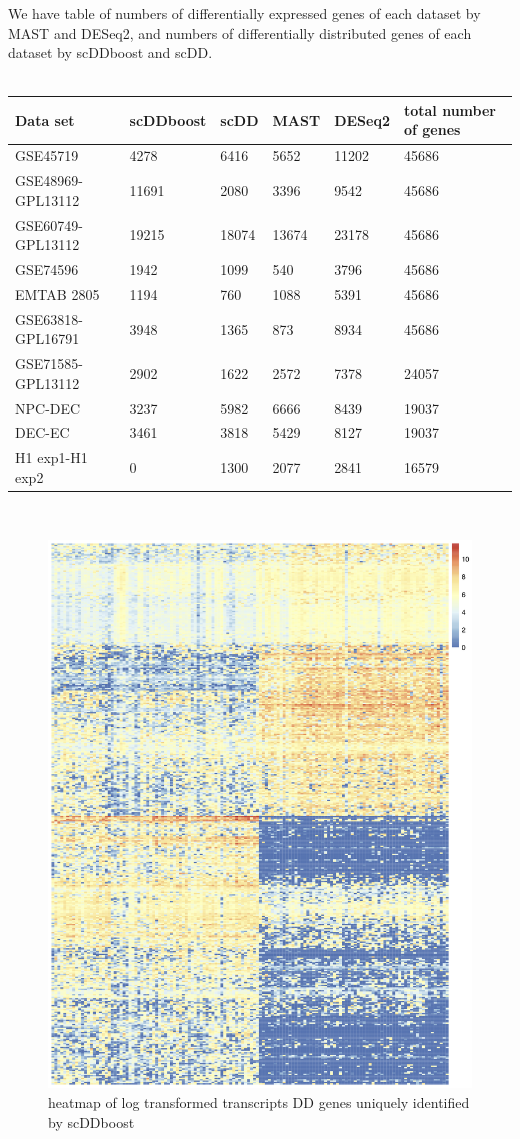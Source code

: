 \documentclass[11pt]{amsart}
\begin{document}
We have table of numbers of differentially expressed genes of each dataset by MAST and DESeq2, and numbers of differentially distributed genes of each dataset by scDDboost and scDD.\\
\\
\begin{tabular}{ |p{2cm}|p{2cm}|p{2cm}|p{2cm}|p{2cm}|p{2cm}|}
\hline
Data set & scDDboost & scDD & MAST & DESeq2 & total number of genes\\
\hline
\hline
GSE45719 & 4278 & 6416 &5652 & 11202 & 45686\\
\hline
GSE48969-GPL13112 & 11691 & 2080 & 3396 & 9542 & 45686\\
\hline
GSE60749-GPL13112 & 19215 &  18074 & 13674 & 23178 & 45686\\
\hline
GSE74596 & 1942 & 1099 & 540 & 3796 & 45686\\
\hline
EMTAB 2805 & 1194 & 760 & 1088 & 5391 & 45686\\
\hline
GSE63818-GPL16791 & 3948 & 1365 & 873 & 8934 & 45686\\
\hline
GSE71585- GPL13112 & 2902 & 1622 & 2572 & 7378 & 24057 \\
\hline
NPC-DEC & 3237 & 5982 & 6666 & 8439 & 19037\\
\hline
DEC-EC & 3461 & 3818 & 5429 & 8127 & 19037\\
\hline
H1 exp1-H1 exp2 &  0 & 1300 & 2077 & 2841 & 16579\\
\hline
\end{tabular}\\
\begin{figure}[h]
\includegraphics[scale = 0.2]{heat2.png}
 \caption{heatmap of log transformed transcripts DD genes uniquely identified by scDDboost}
  \label{fig:5}
\end{figure}
\end{document}
